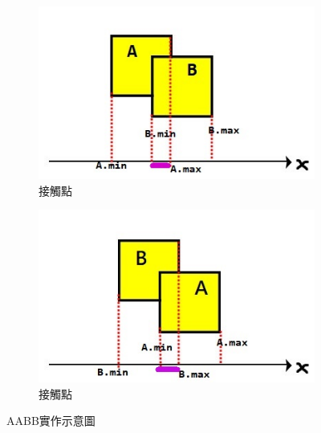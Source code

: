\begin{figure}[h]
    \begin{subfigure}[b]{0.5\linewidth}
    \includegraphics[width=0.8\linewidth]{./resources/physics/AmaxBmin.png}
    \caption{接觸點}
    \end{subfigure}
    \begin{subfigure}[b]{0.5\linewidth}
    \includegraphics[width=0.8\linewidth]{./resources/physics/BmaxAmin.png}
    \caption{接觸點}
    \end{subfigure}
\caption{AABB實作示意圖}
\label{fig:phy_AABB}
\end{figure}

\newpage

